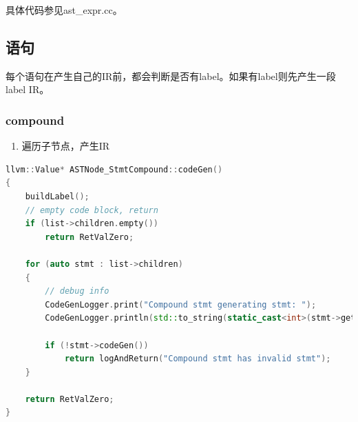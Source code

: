 \documentclass{article}
\begin{document}
\par 具体代码参见ast\_expr.cc。

\subsection{语句}
\par 每个语句在产生自己的IR前，都会判断是否有label。如果有label则先产生一段label IR。
\subsubsection{compound}
\begin{enumerate}
  \item 遍历子节点，产生IR
\end{enumerate}

\begin{lstlisting}[language=C++]
llvm::Value* ASTNode_StmtCompound::codeGen()
{
    buildLabel();
    // empty code block, return
    if (list->children.empty())
        return RetValZero;

    for (auto stmt : list->children)
    {
        // debug info
        CodeGenLogger.print("Compound stmt generating stmt: ");
        CodeGenLogger.println(std::to_string(static_cast<int>(stmt->getType())));

        if (!stmt->codeGen())
            return logAndReturn("Compound stmt has invalid stmt");
    }

    return RetValZero;
}
\end{lstlisting}
\end{document}
